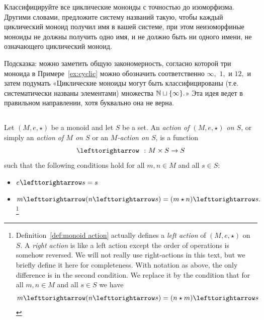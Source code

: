 \documentclass[../main/CT4S-EN-RU]{subfiles}
\begin{document}
\begin{exerciseRUS}\label{exc:classify cyclic}
Классифицируйте все циклические моноиды с точностью до изоморфизма. Другими словами, предложите систему названий такую, чтобы каждый циклический моноид получил имя в вашей системе, при этом неизоморфиные моноиды не должны получить одно имя, и не должно быть ни одного имени, не означающего циклический моноид.

Подсказка: можно заметить общую закономерность, согласно которой три моноида в Примере~\ref{ex:cyclic} можно обозначить соответственно $\infty,$ $1,$ и $12,$ и затем подумать «Циклические моноиды могут быть классифицированы (т.е. систематически названы элементами) множества ${\mathbb N}\sqcup\{\infty\}.$» Эта идея ведет в правильном направлении, хотя буквально она не верна.
\end{exerciseRUS}


\subsection{}

\begin{definitionENG}\label{def:monoid action}
Let $(M,e,\star)$ be a monoid and let $S$ be a set. An {\em action of $(M,e,\star)$ on $S$}, or simply an {\em action of $M$ on $S$} or an {\em $M$-action on $S$}, is a function $$\acts\;\;\taking M\times S\to S$$ such that the following conditions hold for all $m,n\in M$ and all $s\in S$:
\begin{itemize}
\item $e\acts s=s$
\item $m\acts(n\acts s)=(m\star n)\acts s.$%
\footnote{Definition~\ref{def:monoid action} actually defines a {\em left action} of $(M,e,\star)$ on $S.$ A {\em right action} is like a left action except the order of operations is somehow reversed. We will not really use right-actions in this text, but we briefly define it here for completeness. With notation as above, the only difference is in the second condition. We replace it by the condition that for all $m,n\in M$ and all $s\in S$ we have
$$m\acts(n\acts s)=(n\star m)\acts s$$}
\end{itemize}
\end{definitionENG}
\end{document}
